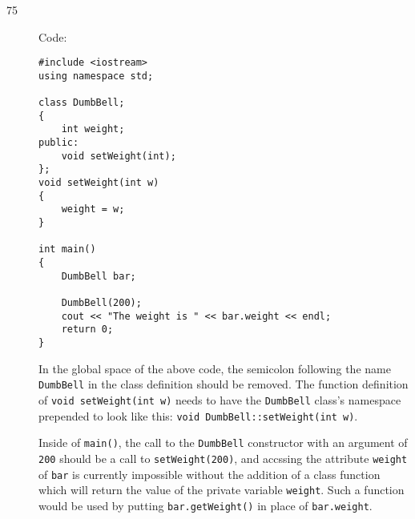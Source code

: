 \documentclass[11pt]{article}
\begin{document}
\begin{description}
\newpage
    \item[75] Code:
\begin{lstlisting}
#include <iostream>
using namespace std;

class DumbBell;
{
    int weight;
public:
    void setWeight(int);
};
void setWeight(int w)
{
    weight = w;
}

int main()
{
    DumbBell bar;

    DumbBell(200);
    cout << "The weight is " << bar.weight << endl;
    return 0;
}
\end{lstlisting}
    In the global space of the above code, the semicolon following the name \lstinline{DumbBell} in the class definition should be removed. The function definition of \lstinline{void setWeight(int w)} needs to have the \lstinline{DumbBell} class's namespace prepended to look like this: \lstinline{void DumbBell::setWeight(int w)}.

    Inside of \lstinline{main()}, the call to the \lstinline{DumbBell} constructor with an argument of \lstinline{200} should be a call to \lstinline{setWeight(200)}, and accssing the attribute \lstinline{weight} of \lstinline{bar} is currently impossible without the addition of a class function which will return the value of the private variable \lstinline{weight}. Such a function would be used by putting  \lstinline{bar.getWeight()} in place of \lstinline{bar.weight}.

\end{description}
\end{document}
